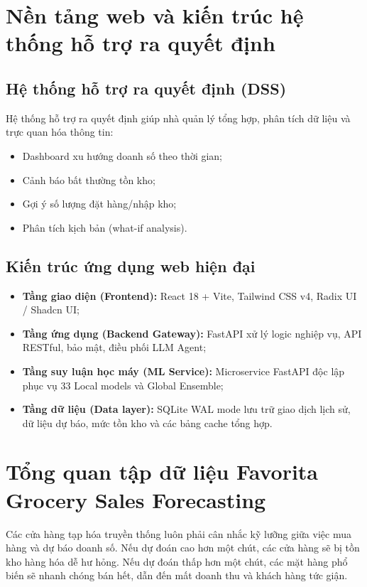 \documentclass[12pt,a4paper]{report}
\begin{document}
\section{Nền tảng web và kiến trúc hệ thống hỗ trợ ra quyết định}
\subsection{Hệ thống hỗ trợ ra quyết định (DSS)}
Hệ thống hỗ trợ ra quyết định giúp nhà quản lý tổng hợp, phân tích dữ liệu và trực quan hóa thông tin:
\begin{itemize}
    \item Dashboard xu hướng doanh số theo thời gian;
    \item Cảnh báo bất thường tồn kho;
    \item Gợi ý số lượng đặt hàng/nhập kho;
    \item Phân tích kịch bản (what-if analysis).
\end{itemize}

\subsection{Kiến trúc ứng dụng web hiện đại}
\begin{itemize}
    \item \textbf{Tầng giao diện (Frontend):} React 18 + Vite, Tailwind CSS v4, Radix UI / Shadcn UI;
    \item \textbf{Tầng ứng dụng (Backend Gateway):} FastAPI xử lý logic nghiệp vụ, API RESTful, bảo mật, điều phối LLM Agent;
    \item \textbf{Tầng suy luận học máy (ML Service):} Microservice FastAPI độc lập phục vụ 33 Local models và Global Ensemble;
    \item \textbf{Tầng dữ liệu (Data layer):} SQLite WAL mode lưu trữ giao dịch lịch sử, dữ liệu dự báo, mức tồn kho và các bảng cache tổng hợp.
\end{itemize}

\section{Tổng quan tập dữ liệu Favorita Grocery Sales Forecasting}

Các cửa hàng tạp hóa truyền thống luôn phải cân nhắc kỹ lưỡng giữa việc mua hàng và dự báo doanh số. Nếu dự đoán cao hơn một chút, các cửa hàng sẽ bị tồn kho hàng hóa dễ hư hỏng. Nếu dự đoán thấp hơn một chút, các mặt hàng phổ biến sẽ nhanh chóng bán hết, dẫn đến mất doanh thu và khách hàng tức giận.
\end{document}
